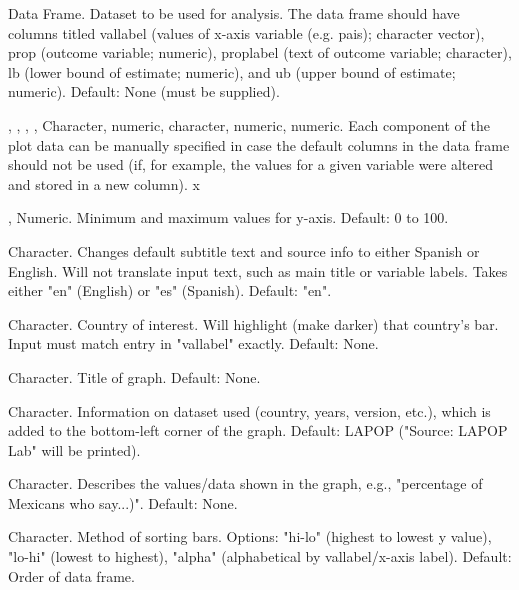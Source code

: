 \documentclass[a4paper]{book}
\begin{document}
%
\begin{Arguments}
\begin{ldescription}
\item[\code{data}] Data Frame. Dataset to be used for analysis.  The data frame should have columns
titled vallabel (values of x-axis variable (e.g. pais); character vector), prop (outcome variable; numeric),
proplabel (text of outcome variable; character), lb (lower bound of estimate; numeric),
and ub (upper bound of estimate; numeric). Default: None (must be supplied).

\item[\code{vallabel}, \code{outcome\_var}, \code{label\_var}, \code{lower\_bound}, \code{upper\_bound}] Character, numeric, character,
numeric, numeric. Each component of the plot data can be manually specified in case
the default columns in the data frame should not be used (if, for example, the values for a given
variable were altered and stored in a new column). x

\item[\code{ymin}, \code{ymax}] Numeric.  Minimum and maximum values for y-axis. Default: 0 to 100.

\item[\code{lang}] Character.  Changes default subtitle text and source info to either Spanish or English.
Will not translate input text, such as main title or variable labels.  Takes either "en" (English)
or "es" (Spanish).  Default: "en".

\item[\code{highlight}] Character.  Country of interest.  Will highlight (make darker) that country's bar.
Input must match entry in "vallabel" exactly. Default: None.

\item[\code{main\_title}] Character.  Title of graph.  Default: None.

\item[\code{source\_info}] Character.  Information on dataset used (country, years, version, etc.),
which is added to the bottom-left corner of the graph. Default: LAPOP ("Source: LAPOP Lab" will be printed).

\item[\code{subtitle}] Character.  Describes the values/data shown in the graph, e.g., "percentage of Mexicans who say...)".
Default: None.

\item[\code{sort}] Character. Method of sorting bars.  Options: "hi-lo" (highest to lowest y value), "lo-hi" (lowest to highest),
"alpha" (alphabetical by vallabel/x-axis label). Default: Order of data frame.


\end{ldescription}
\end{Arguments}
\end{document}
